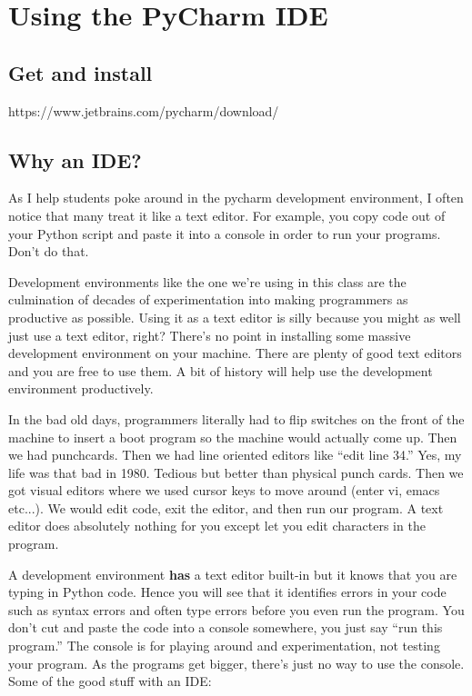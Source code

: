 \chapter{Using the PyCharm IDE}

\setcounter{problem}{1}

\section{Get and install}

\begin{fullwidth}

https://www.jetbrains.com/pycharm/download/

\section{Why an IDE?}

As I help students poke around in the pycharm development environment, I often notice that many treat it like a text editor. For example, you copy code out of your Python script and paste it into a console in order to run your programs.  Don't do that. 

Development environments like the one we're using in this class are the culmination of decades of experimentation into making programmers as productive as possible. Using it as a text editor is silly because you might as well just use a text editor, right? There's no point in installing some massive development environment on your machine. There are plenty of good text editors and you are free to use them. A bit of history will help use the development environment productively.

In the bad old days, programmers literally had to flip switches on the front of the machine to insert a boot  program so the machine would actually come up. Then we had punchcards. Then we had line oriented editors like ``edit line 34.''  Yes, my life was that bad in 1980. Tedious but better than physical punch cards. Then we got visual editors where we used cursor keys to move around (enter vi, emacs etc...). We would edit code, exit the editor, and then run our program. A text editor does absolutely nothing for you except let you edit characters in the program.

A development environment {\bf has} a text editor built-in but it knows that you are typing in Python code. Hence you will see that it identifies errors in your code such as syntax errors and often type errors before you even run the program. You don't cut and paste the code into a console somewhere, you just say ``run this program.'' The console is for playing around and experimentation, not testing your program. As the programs get bigger, there's just no way to use the console.  Some of the good stuff with an IDE:


\end{fullwidth}
